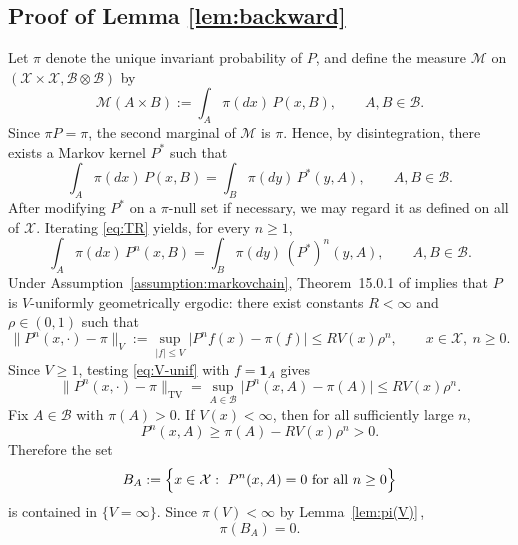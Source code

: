 \documentclass[mnsc,nonblindrev]{informs3}
\begin{document}
\subsection{Proof of Lemma \ref{lem:backward}}\label{sec:proof-backward}
Let \(\pi\) denote the unique invariant probability of \(P\), and define the measure
\(\mathcal M\) on \((\mathcal X\times\mathcal X,\mathcal B\otimes\mathcal B)\) by
\[
\mathcal M(A\times B):=\int_A \pi(dx)\,P(x,B),\qquad A,B\in\mathcal B.
\]
Since \(\pi P=\pi\), the second marginal of \(\mathcal M\) is \(\pi\). Hence, by
disintegration, there exists a Markov kernel \(P^\ast\) such that
\begin{equation}\label{eq:TR}
\int_A \pi(dx)\,P(x,B)=\int_B \pi(dy)\,P^\ast(y,A),
\qquad A,B\in\mathcal B.
\end{equation}
After modifying \(P^\ast\) on a \(\pi\)-null set if necessary, we may regard it as
defined on all of \(\mathcal X\). Iterating \eqref{eq:TR} yields, for every
\(n\ge1\),
\begin{equation}\label{eq:TR-n}
\int_A \pi(dx)\,P^n(x,B)=\int_B \pi(dy)\,(P^\ast)^n(y,A),
\qquad A,B\in\mathcal B.
\end{equation}
Under Assumption~\ref{assumption:markovchain}, Theorem~15.0.1 of
\cite{Meyn12_book} implies that \(P\) is \(V\)-uniformly geometrically ergodic:
there exist constants \(R<\infty\) and \(\rho\in(0,1)\) such that
\begin{equation}\label{eq:V-unif}
\bigl\|P^n(x,\cdot)-\pi\bigr\|_V
:=\sup_{|f|\le V}\bigl|P^n f(x)-\pi(f)\bigr|
\le RV(x)\rho^n,
\qquad x\in\mathcal X,\ n\ge0.
\end{equation}
Since \(V\ge1\), testing \eqref{eq:V-unif} with \(f=\mathbf 1_A\) gives
\begin{equation}\label{eq:tv-bound}
\bigl\|P^n(x,\cdot)-\pi\bigr\|_{\mathrm{TV}}
=\sup_{A\in\mathcal B}\bigl|P^n(x,A)-\pi(A)\bigr|
\le RV(x)\rho^n.
\end{equation}
Fix \(A\in\mathcal B\) with \(\pi(A)>0\). If \(V(x)<\infty\), then for all
sufficiently large \(n\),
\[
P^n(x,A)\ge \pi(A)-RV(x)\rho^n>0.
\]
Therefore the set
\begin{equation}\label{eq:BA-def}
B_A:=\Bigl\{x\in\mathcal X:\ P^n(x,A)=0\ \text{for all }n\ge0\Bigr\}
\end{equation}
is contained in \(\{V=\infty\}\). Since \(\pi(V)<\infty\) by
Lemma~\ref{lem:pi(V)}\,,
\begin{equation}\label{eq:BA-zero}
\pi(B_A)=0.
\end{equation}
\end{document}
